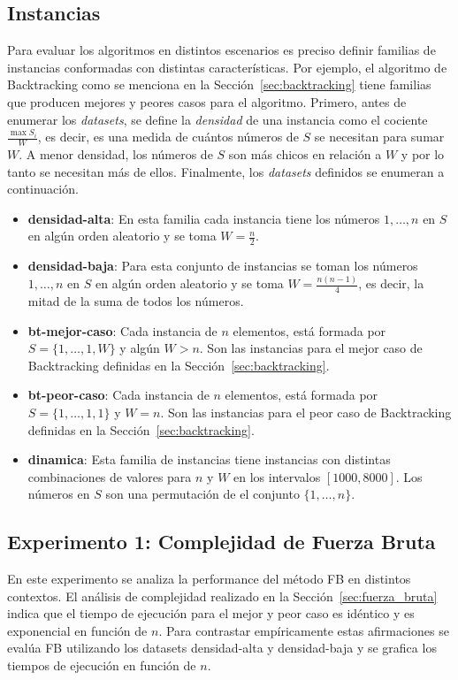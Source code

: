 \documentclass[10pt,a4paper]{article}
\begin{document}
\subsection{Instancias}
Para evaluar los algoritmos en distintos escenarios es preciso definir familias de instancias conformadas con distintas características. Por ejemplo, el algoritmo de Backtracking como se menciona en la Sección~\ref{sec:backtracking} tiene familias que producen mejores y peores casos para el algoritmo. Primero, antes de enumerar los \emph{datasets}, se define la \emph{densidad} de una instancia como el cociente $\frac{\max S_i}{W}$, es decir, es una medida de cuántos números de $S$ se necesitan para sumar $W$. A menor densidad, los números de $S$ son más chicos en relación a $W$ y por lo tanto se necesitan más de ellos. Finalmente, los \emph{datasets} definidos se enumeran a continuación.
\begin{itemize}
    \setlength{\itemsep}{1pt}
    \setlength{\parskip}{0pt}
    \setlength{\parsep}{0pt}
    \item \textbf{densidad-alta}: En esta familia cada instancia tiene los números $1, \hdots, n$ en $S$ en algún orden aleatorio y se toma $W = \frac{n}{2}$.
    \item \textbf{densidad-baja}: Para esta conjunto de instancias se toman los números $1, \hdots, n$ en $S$ en algún orden aleatorio y se toma $W = \frac{n (n-1)}{4}$, es decir, la mitad de la suma de todos los números.
    \item \textbf{bt-mejor-caso}: Cada instancia de $n$ elementos, está formada por $S = \{1, \hdots, 1, W\}$ y algún $W > n$. Son las instancias para el mejor caso de Backtracking definidas en la Sección~\ref{sec:backtracking}.
    \item \textbf{bt-peor-caso}: Cada instancia de $n$ elementos, está formada por $S = \{1, \hdots, 1, 1\}$ y $W = n$. Son las instancias para el peor caso de Backtracking definidas en la Sección~\ref{sec:backtracking}.
    \item \textbf{dinamica}: Esta familia de instancias tiene instancias con distintas combinaciones de valores para $n$ y $W$ en los intervalos $[1000, 8000]$. Los números en $S$ son una permutación de el conjunto $\{1, \hdots, n\}$.
\end{itemize}

\subsection{Experimento 1: Complejidad de Fuerza Bruta}
En este experimento se analiza la performance del método FB en distintos contextos. El análisis de complejidad realizado en la Sección~\ref{sec:fuerza_bruta} indica que el tiempo de ejecución para el mejor y peor caso es idéntico y es exponencial en función de $n$. Para contrastar empíricamente estas afirmaciones se evalúa FB utilizando los datasets densidad-alta y densidad-baja y se grafica los tiempos de ejecución en función de $n$. 
\end{document}
